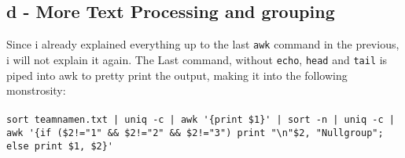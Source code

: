 \documentclass[a4paper, 11pt]{article}
\begin{document}
    \subsection{d - More Text Processing and grouping}
    Since i already explained everything up to the last \texttt{awk} command in the previous, i will not explain it again.
    The Last command, without \texttt{echo}, \texttt{head} and \texttt{tail} is piped into awk to pretty print the output, making it into the following monstrosity:\\\\
    \lstinline+sort teamnamen.txt | uniq -c | awk '{print $1}' | sort -n | uniq -c | awk '{if ($2!="1" && $2!="2" && $2!="3") print "\n"$2, "Nullgroup"; else print $1, $2}'+
\end{document}
